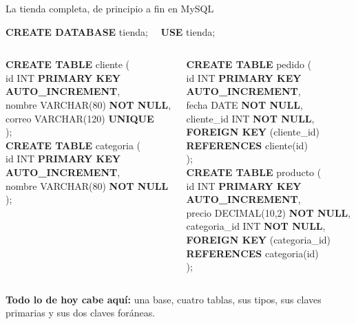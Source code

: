 \documentclass[aspectratio=169,10pt,c]{beamer}
\newcommand{\kw}[1]{\textcolor{utpRojo}{\textbf{#1}}}
\newenvironment{sqlcode}[1][.86\textwidth]
  {\begin{center}\begin{lrbox}{\sqlbuf}\begin{minipage}{#1}\ttfamily\footnotesize\vspace{6pt}\raggedright}
  {\vspace{6pt}\end{minipage}\end{lrbox}\colorbox{utpGrisClaro}{\usebox{\sqlbuf}}\end{center}}
\newcommand{\ind}{\hspace*{1.6em}}
\begin{document}
\begin{frame}{La tienda completa, de principio a fin en MySQL}
\begin{sqlcode}[.97\textwidth]
\scriptsize
\kw{CREATE DATABASE} tienda; \ \ \kw{USE} tienda;
\end{sqlcode}
\vspace{-0.25cm}
\begin{columns}[T,onlytextwidth]
\begin{sqlcode}[\textwidth]
\scriptsize
\kw{CREATE TABLE} cliente (\\
\ind id INT \kw{PRIMARY KEY} \kw{AUTO\_INCREMENT},\\
\ind nombre VARCHAR(80) \kw{NOT NULL},\\
\ind correo VARCHAR(120) \kw{UNIQUE}\\
);\\[7pt]
\kw{CREATE TABLE} categoria (\\
\ind id INT \kw{PRIMARY KEY} \kw{AUTO\_INCREMENT},\\
\ind nombre VARCHAR(80) \kw{NOT NULL}\\
);
\end{sqlcode}
\begin{sqlcode}[\textwidth]
\scriptsize
\kw{CREATE TABLE} pedido (\\
\ind id INT \kw{PRIMARY KEY} \kw{AUTO\_INCREMENT},\\
\ind fecha DATE \kw{NOT NULL},\\
\ind cliente\_id INT \kw{NOT NULL},\\
\ind \kw{FOREIGN KEY} (cliente\_id)\\
\ind\ind \kw{REFERENCES} cliente(id)\\
);\\[7pt]
\kw{CREATE TABLE} producto (\\
\ind id INT \kw{PRIMARY KEY} \kw{AUTO\_INCREMENT},\\
\ind precio DECIMAL(10,2) \kw{NOT NULL},\\
\ind categoria\_id INT \kw{NOT NULL},\\
\ind \kw{FOREIGN KEY} (categoria\_id)\\
\ind\ind \kw{REFERENCES} categoria(id)\\
);
\end{sqlcode}
\end{columns}
\vspace{0.15cm}
\small \textbf{Todo lo de hoy cabe aquí:} una base, cuatro tablas, sus tipos, sus claves primarias y sus dos claves foráneas.
\end{frame}
\end{document}
